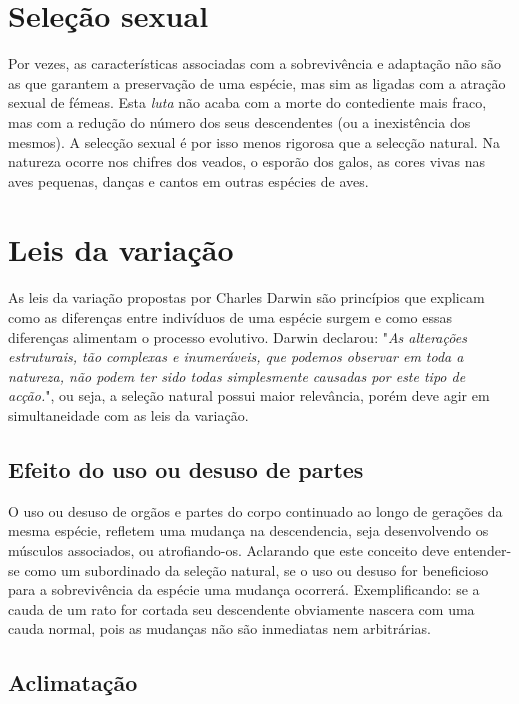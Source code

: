\documentclass{report}
\begin{document}
\section{Seleção sexual}

Por vezes, as características associadas com a sobrevivência e adaptação não são as que garantem a preservação de uma espécie, mas sim as ligadas com a atração sexual de fémeas. Esta \textit{luta} não acaba com a morte do contediente mais fraco, mas com a redução do número dos seus descendentes (ou a inexistência dos mesmos). A selecção sexual é por isso menos rigorosa que a selecção natural. Na natureza ocorre nos chifres dos veados, o esporão dos galos, as cores vivas nas aves pequenas, danças e cantos em outras espécies de aves. 

\section{Leis da variação}

As leis da variação propostas por Charles Darwin são princípios que explicam como as diferenças entre indivíduos de uma espécie surgem e como essas diferenças alimentam o processo evolutivo. Darwin declarou: "\textit{As alterações estruturais, tão complexas e inumeráveis, que podemos observar em toda a natureza, não podem ter sido todas simplesmente causadas por este tipo de acção.}", ou seja, a seleção natural possui maior relevância, porém deve agir em simultaneidade com as leis da variação.
  
\subsection{Efeito do uso ou desuso de partes}

O uso ou desuso de orgãos e partes do corpo continuado ao longo de gerações da mesma espécie, refletem uma mudança na descendencia, seja desenvolvendo os músculos associados, ou atrofiando-os. Aclarando que este conceito deve entender-se como um subordinado da seleção natural, se o uso ou desuso for beneficioso para a sobrevivência da espécie uma mudança ocorrerá. Exemplificando: se a cauda de um rato for cortada seu descendente obviamente nascera com uma cauda normal, pois as mudanças não são inmediatas nem arbitrárias. 

\subsection{Aclimatação}
\end{document}
